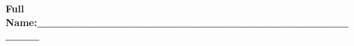 \usepackage{times}
\usepackage{alltt}
\usepackage{exam}
\usepackage[dvips]{graphicx} 

\oddsidemargin 0pt
\evensidemargin 0pt
\textheight 600pt
\textwidth 469pt
\setlength{\parindent}{0em}
\setlength{\parskip}{1ex}


\begin{flushright}
{\large\bf Full Name:\_\_\_\_\_\_\_\_\_\_\_\_\_\_\_\_\_\_\_\_\_\_\_\_\_\_\_\_\_\_\_\_\_\_\_\_\_\_\_\_\_ } \\[1ex]
\end{flushright}
\vspace*{0.5 in}

